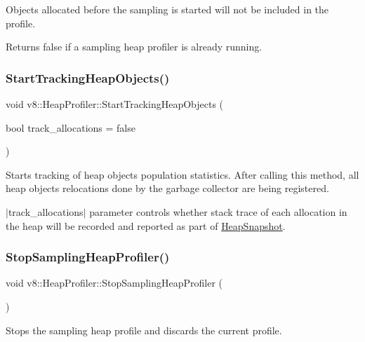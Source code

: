 Objects allocated before the sampling is started will not be included in the profile.

Returns false if a sampling heap profiler is already running. \mbox{\label{classv8_1_1HeapProfiler_a02917db133b7efd468c9c73075a15171}} 
\subsubsection{\texorpdfstring{Start\+Tracking\+Heap\+Objects()}{StartTrackingHeapObjects()}}
{\footnotesize\ttfamily void v8\+::\+Heap\+Profiler\+::\+Start\+Tracking\+Heap\+Objects (\begin{DoxyParamCaption}\item[{bool}]{track\+\_\+allocations = {\ttfamily false} }\end{DoxyParamCaption})}

Starts tracking of heap objects population statistics. After calling this method, all heap objects relocations done by the garbage collector are being registered.

$\vert$track\+\_\+allocations$\vert$ parameter controls whether stack trace of each allocation in the heap will be recorded and reported as part of \mbox{\hyperlink{classv8_1_1HeapSnapshot}{Heap\+Snapshot}}. \mbox{\label{classv8_1_1HeapProfiler_abc43e12e6febb087be251c0629ff17bf}} 
\subsubsection{\texorpdfstring{Stop\+Sampling\+Heap\+Profiler()}{StopSamplingHeapProfiler()}}
{\footnotesize\ttfamily void v8\+::\+Heap\+Profiler\+::\+Stop\+Sampling\+Heap\+Profiler (\begin{DoxyParamCaption}{ }\end{DoxyParamCaption})}

Stops the sampling heap profile and discards the current profile. \mbox{\label{classv8_1_1HeapProfiler_ae448d9474ae34781133d4a4547b08cb1}} 
